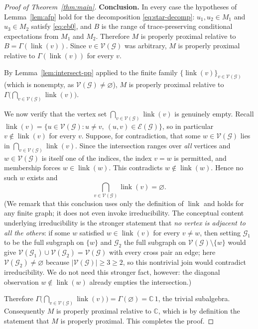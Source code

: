 \documentclass[a4paper, 11pt, reqno]{amsart}
\numberwithin{equation}{section}
\theoremstyle{plain}
\theoremstyle{remark}
\theoremstyle{definition}
\newcommand{\C}{\mathbb{C}}
\newcommand{\VV}{{\mathcal V}}
\newcommand{\EE}{{\mathcal E}}
\newcommand{\GG}{{\mathcal G}}
\begin{document}
\begin{proof}[Proof of Theorem~\ref{thm:main}]
\medskip\noindent\textbf{Conclusion.}
In every case the hypotheses of Lemma~\ref{lem:afp} hold for the decomposition \eqref{eq:star-decomp}: $u_1,u_2\in M_1$ and $u_3\in M_2$ satisfy \eqref{eq:eb0}, and $B$ is the range of trace-preserving conditional expectations from $M_1$ and $M_2$. Therefore $M$ is properly proximal relative to $B=\Gamma(\operatorname{link}(v))$. Since $v\in\VV(\GG)$ was arbitrary, $M$ is properly proximal relative to $\Gamma(\operatorname{link}(v))$ for every $v$.

By Lemma~\ref{lem:intersect-pp} applied to the finite family $\{\operatorname{link}(v)\}_{v\in\VV(\GG)}$ (which is nonempty, as $\VV(\GG)\neq\varnothing$), $M$ is properly proximal relative to $\Gamma\big(\bigcap_{v\in\VV(\GG)}\operatorname{link}(v)\big)$.

We now verify that the vertex set $\bigcap_{v\in\VV(\GG)}\operatorname{link}(v)$ is genuinely empty. Recall $\operatorname{link}(v)=\{u\in\VV(\GG):u\neq v,\ (u,v)\in\EE(\GG)\}$, so in particular $v\notin\operatorname{link}(v)$ for every $v$. Suppose, for contradiction, that some $w\in\VV(\GG)$ lies in $\bigcap_{v\in\VV(\GG)}\operatorname{link}(v)$. Since the intersection ranges over \emph{all} vertices and $w\in\VV(\GG)$ is itself one of the indices, the index $v=w$ is permitted, and membership forces $w\in\operatorname{link}(w)$. This contradicts $w\notin\operatorname{link}(w)$. Hence no such $w$ exists and
\[
\bigcap_{v\in\VV(\GG)}\operatorname{link}(v)=\varnothing .
\]
(We remark that this conclusion uses only the definition of $\operatorname{link}$ and holds for any finite graph; it does not even invoke irreducibility. The conceptual content underlying irreducibility is the stronger statement that \emph{no vertex is adjacent to all the others}: if some $w$ satisfied $w\in\operatorname{link}(v)$ for every $v\neq w$, then setting $\GG_1$ to be the full subgraph on $\{w\}$ and $\GG_2$ the full subgraph on $\VV(\GG)\setminus\{w\}$ would give $\VV(\GG_1)\cup\VV(\GG_2)=\VV(\GG)$ with every cross pair an edge; here $\VV(\GG_2)\neq\varnothing$ because $|\VV(\GG)|\ge3\ge2$, so this nontrivial join would contradict irreducibility. We do not need this stronger fact, however: the diagonal observation $w\notin\operatorname{link}(w)$ already empties the intersection.)

Therefore $\Gamma\big(\bigcap_{v\in\VV(\GG)}\operatorname{link}(v)\big)=\Gamma(\varnothing)=\C\,1$, the trivial subalgebra. Consequently $M$ is properly proximal relative to $\C$, which is by definition the statement that $M$ is properly proximal. This completes the proof.
\end{proof}
\end{document}
